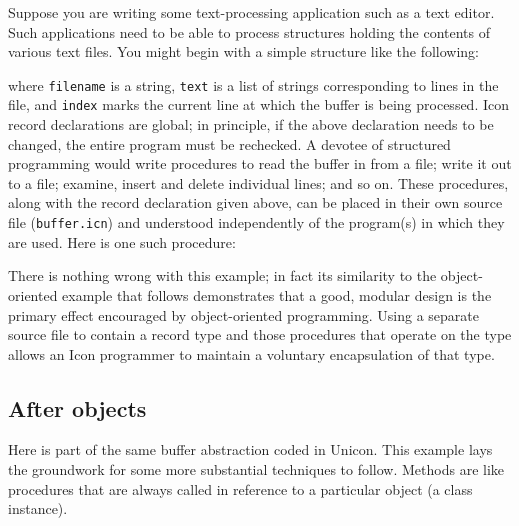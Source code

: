 Suppose you are writing some text-processing application such as a text
editor. Such applications need to be able to process
structures holding the contents of various text files. You might begin
with a simple structure like the following: 


\noindent
where \texttt{filename} is a string, \texttt{text} is a list of strings
corresponding to lines in the file, and \texttt{index} marks
the current line at which the buffer is being processed. Icon record
declarations are global; in principle, if the above declaration needs
to be changed, the entire program must be rechecked. A devotee of
structured programming would write procedures to read the buffer
in from a file; write it out to a file; examine, insert and delete
individual lines; and so on. These procedures, along with the record
declaration given above, can be placed in their own source file
(\texttt{buffer.icn}) and understood independently of the program(s) in
which they are used. Here is one such procedure: 


There is nothing wrong with this example; in fact its similarity to the
object-oriented example that follows demonstrates that a good, modular
design is the primary effect encouraged by object-oriented programming. Using a separate source file
to contain a record type and those procedures that operate on the type
allows an Icon programmer to maintain a voluntary encapsulation of that
type. 

\subsection{After objects}

Here is part of the same buffer abstraction coded in Unicon. This
example lays the groundwork for some more substantial techniques to
follow. Methods are like procedures that are always called in reference
to a particular object (a class instance).

